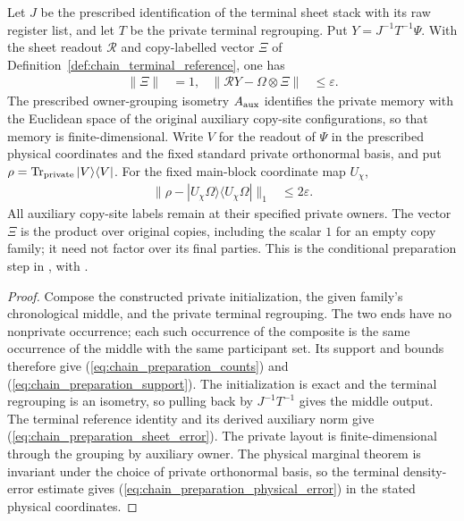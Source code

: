 \begin{lemma}
    Let $J$ be the prescribed identification of the terminal sheet stack
    with its raw register list, and let $T$ be the private
    terminal regrouping. Put $Y=J^{-1}T^{-1}\Psi$.
    With the sheet readout $\mathcal R$ and copy-labelled vector $\Xi$
    of Definition~\ref{def:chain_terminal_reference}, one has
    \begin{align}
        \|\Xi\|                          & =1,             &
        \|\mathcal RY-\Omega\otimes\Xi\| & \le\varepsilon.
        \label{eq:chain_preparation_sheet_error}
    \end{align}
    The prescribed owner-grouping isometry $A_{\rm aux}$ identifies the
    private memory with the Euclidean space of the original auxiliary
    copy-site configurations, so that memory is finite-dimensional.
    Write $V$ for the readout of $\Psi$ in the prescribed physical
    coordinates and the fixed standard private orthonormal basis, and put
    $\rho=\operatorname{Tr}_{\rm private}|V\rangle\langle V|$.
    For the fixed main-block coordinate map $U_\chi$,
    \begin{align}
        \|\rho-|U_\chi\Omega\rangle\langle U_\chi\Omega|\|_1
         & \le2\varepsilon.
        \label{eq:chain_preparation_physical_error}
    \end{align}
    All auxiliary copy-site labels remain at their specified private
    owners. The vector $\Xi$ is the product over original copies,
    including the scalar $1$ for an empty copy family; it need not
    factor over its final parties. This is the conditional preparation
    step in \cite[Part~II]{TNLean2026OneDimensional}, with
    \cite{gap:tnlean_one_dimensional_band_sweep_corrections}.
\end{lemma}
\begin{proof}\leanok
    Compose the constructed private initialization, the given family's
    chronological middle, and the private terminal regrouping.
    The two ends have no nonprivate occurrence; each such occurrence
    of the composite is the same occurrence of the middle with the same
    participant set. Its support and bounds therefore give
    (\ref{eq:chain_preparation_counts}) and
    (\ref{eq:chain_preparation_support}). The initialization is exact
    and the terminal regrouping is an isometry, so pulling back by
    $J^{-1}T^{-1}$ gives the middle output. The terminal reference
    identity and its derived auxiliary norm give
    (\ref{eq:chain_preparation_sheet_error}). The private layout
    is finite-dimensional through the grouping by auxiliary
    owner. The physical marginal theorem is invariant under the choice
    of private orthonormal basis, so the terminal density-error estimate
    gives (\ref{eq:chain_preparation_physical_error}) in the stated
    physical coordinates.
\end{proof}

